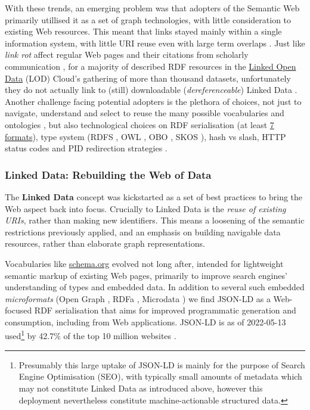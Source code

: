 \documentclass[fleqn,10pt,lineno]{wlpeerj}
\begin{document}
With these trends, an emerging problem was that adopters of the Semantic Web primarily utillised it as a set of graph technologies, with little consideration to existing Web resources. This meant that links stayed mainly within a single information system, with little URI reuse even with large term overlaps \cite{9CdJnsoJ}. Just like \emph{link rot} affect regular Web pages and their citations from scholarly communication \cite{AGHR9oyr}, for a majority of described RDF resources in the \href{https://lod-cloud.net/}{Linked Open Data} (LOD) Cloud's gathering of more than thousand datasets, unfortunately they do not actually link to (still) downloadable (\emph{dereferenceable}) Linked Data \cite{5SuwLNdE}. Another challenge facing potential adopters is the plethora of choices, not just to navigate, understand and select to reuse the many possible vocabularies and ontologies \cite{TUmA4KQT}, but also technological choices on RDF serialisation (at least \href{https://www.w3.org/TR/rdf11-primer/\#section-graph-syntax}{7 formats}), type system (RDFS \cite{ZwAcGQKY}, OWL \cite{1p4IWJpI}, OBO \cite{1DalZuKct}, SKOS \cite{15gQDya5B}), hash vs slash, HTTP status codes and PID redirection strategies \cite{rnzJ4khD}.

\hypertarget{sec:ld-web}{%
\subsubsection*{Linked Data: Rebuilding the Web of Data}\label{sec:ld-web}}

The \textbf{Linked Data} concept \cite{19s3yyxDn} was kickstarted as a set of best practices \cite{OGXYtGZ8} to bring the Web aspect back into focus. Crucially to Linked Data is the \emph{reuse of existing URIs}, rather than making new identifiers. This means a loosening of the semantic restrictions previously applied, and an emphasis on building navigable data resources, rather than elaborate graph representations.

Vocabularies like \href{https://schema.org/}{schema.org} evolved not long after, intended for lightweight semantic markup of existing Web pages, primarily to improve search engines' understanding of types and embedded data. In addition to several such embedded \emph{microformats} (Open Graph \cite{oN9D5LkD}, RDFa \cite{FKIF6ApB}, Microdata \cite{14Utscfe4}) we find JSON-LD \cite{X5SWPqSU} as a Web-focused RDF serialisation that aims for improved programmatic generation and consumption, including from Web applications. JSON-LD is as of 2022-05-13 used\footnote{Presumably this large uptake of JSON-LD is mainly for the purpose of Search Engine Optimisation (SEO), with typically small amounts of metadata which may not constitute Linked Data as introduced above, however this deployment nevertheless constitute machine-actionable structured data.} by 42.7\% of the top 10 million websites \cite{j3SqQLBR}.
\end{document}
